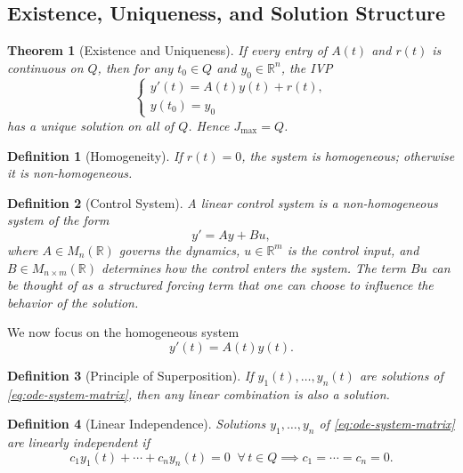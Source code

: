 \documentclass{article}
\newtheorem{theorem}{Theorem}
\newtheorem{definition}{Definition}
\newcommand{\R}{\mathbb{R}}
\begin{document}
\subsection{Existence, Uniqueness, and Solution Structure}

\begin{theorem}[Existence and Uniqueness]
    If every entry of $A(t)$ and $r(t)$ is continuous on $Q$, then 
    for any $t_0 \in Q$ and $y_0 \in \R^n$, the IVP
    \[\begin{cases}y'(t) = A(t)y(t) + r(t),\\ y(t_0) = y_0\end{cases}\]
    has a unique solution on all of $Q$. Hence $J_{\max} = Q$.
\end{theorem}

\begin{definition}[Homogeneity]
    If $r(t) = 0$, the system is homogeneous; otherwise it 
    is non-homogeneous.
\end{definition}

\begin{definition}[Control System]
    A \emph{linear control system} is a non-homogeneous system of 
    the form
    \[y' = Ay + Bu,\]
    where $A \in M_n(\R)$ governs the dynamics, 
    $u \in \R^m$ is the control input, and 
    $B \in M_{n \times m}(\R)$ determines how the control 
    enters the system. The term $Bu$ can be thought of as a 
    structured forcing term that one can choose to influence the 
    behavior of the solution.
\end{definition}

We now focus on the homogeneous system
\begin{equation}
    \label{eq:ode-system-matrix}
    y'(t) = A(t)y(t).
\end{equation}

\begin{definition}[Principle of Superposition]
    \label{POS}
    If $y_1(t), \dots, y_n(t)$ are solutions of 
    \eqref{eq:ode-system-matrix}, then any linear combination 
    is also a solution.
\end{definition}

\begin{definition}[Linear Independence]
    Solutions $y_1, \dots, y_n$ of \eqref{eq:ode-system-matrix} 
    are linearly independent if
    \[c_1 y_1(t) + \cdots + c_n y_n(t) = 0 \;\; \forall\, t \in Q 
    \implies c_1 = \cdots = c_n = 0.\]
\end{definition}
\end{document}
